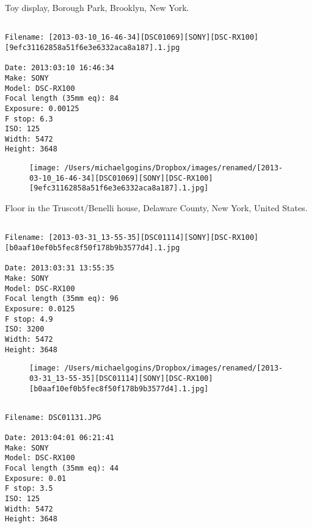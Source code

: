 \clearpage
\onecolumn
\noindent Toy display, Borough Park, Brooklyn, New York.
\noindent
\begin{lstlisting}

Filename: [2013-03-10_16-46-34][DSC01069][SONY][DSC-RX100][9efc31162858a51f6e3e6332aca8a187].1.jpg

Date: 2013:03:10 16:46:34
Make: SONY
Model: DSC-RX100
Focal length (35mm eq): 84
Exposure: 0.00125
F stop: 6.3
ISO: 125
Width: 5472
Height: 3648
\end{lstlisting}
\clearpage

\begin{figure}
\texttt{[image: /Users/michaelgogins/Dropbox/images/renamed/[2013-03-10\_16-46-34][DSC01069][SONY][DSC-RX100][9efc31162858a51f6e3e6332aca8a187].1.jpg]}
\end{figure}
    
\clearpage
\onecolumn
\noindent Floor in the Truscott/Benelli house, Delaware County, New York, United States.
\noindent
\begin{lstlisting}

Filename: [2013-03-31_13-55-35][DSC01114][SONY][DSC-RX100][b0aaf10ef0b5fec8f50f178b9b3577d4].1.jpg

Date: 2013:03:31 13:55:35
Make: SONY
Model: DSC-RX100
Focal length (35mm eq): 96
Exposure: 0.0125
F stop: 4.9
ISO: 3200
Width: 5472
Height: 3648
\end{lstlisting}
\clearpage

\begin{figure}
\texttt{[image: /Users/michaelgogins/Dropbox/images/renamed/[2013-03-31\_13-55-35][DSC01114][SONY][DSC-RX100][b0aaf10ef0b5fec8f50f178b9b3577d4].1.jpg]}
\end{figure}
    
\clearpage
\onecolumn
\noindent 
\noindent
\begin{lstlisting}

Filename: DSC01131.JPG

Date: 2013:04:01 06:21:41
Make: SONY
Model: DSC-RX100
Focal length (35mm eq): 44
Exposure: 0.01
F stop: 3.5
ISO: 125
Width: 5472
Height: 3648
\end{lstlisting}
\clearpage

